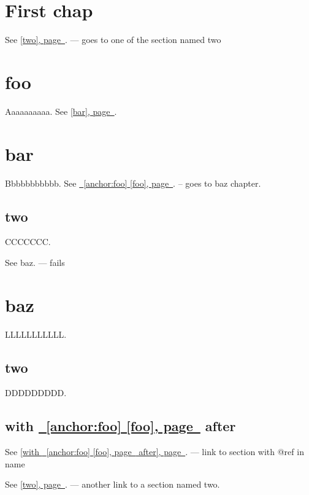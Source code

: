 \documentclass{book}
\newcommand{\Texinfothechapterheading}{}
\newcommand{\Texinfoheadingchaptername}{\chaptername}
\newcommand{\Texinfochapter}[1]{\chapter{#1}
\renewcommand{\Texinfothechapterheading}{\Texinfoheadingchaptername{} \thechapter{} }%
}%
\renewcommand{\_}{\Texinfounderscore\discretionary{}{}{}}
\begin{document}
\label{anchor:Top}%
\Texinfochapter{{First chap}}
\label{anchor:first}%

See \hyperref[anchor:two]{[two], page~\pageref*{anchor:two}}. --- goes to one of the section named two

\Texinfochapter{{foo}}

Aaaaaaaaaa.  See \hyperref[anchor:bar]{[bar], page~\pageref*{anchor:bar}}.

\Texinfochapter{{bar}}
\label{anchor:bar}%

Bbbbbbbbbbb.  See \hyperref[anchor:foo]{\chaptername~\ref*{anchor:foo} [foo], page~\pageref*{anchor:foo}}. -- goes to baz chapter.

\section{{two}}
\label{anchor:two}%

CCCCCCC.

See baz. --- fails

\Texinfochapter{{baz}}
\label{anchor:foo}%

LLLLLLLLLLL.

\section{{two}}

DDDDDDDDD.

\section{{with \texorpdfstring{\hyperref[anchor:foo]{\chaptername~\ref*{anchor:foo} [foo], page~\pageref*{anchor:foo}}}{foo} after}}
\label{anchor:with-foo-after}%

See \hyperref[anchor:with-foo-after]{[with \hyperref[anchor:foo]{\chaptername~\ref*{anchor:foo} [foo], page~\pageref*{anchor:foo}} after], page~\pageref*{anchor:with-foo-after}}. --- link to section with @ref in name

See \hyperref[anchor:two]{[two], page~\pageref*{anchor:two}}. --- another link to a section named two.
\end{document}
